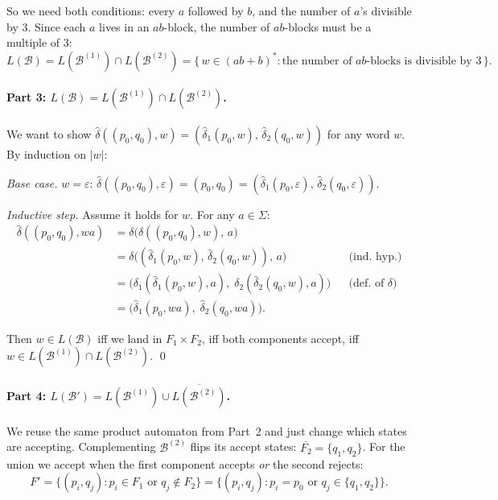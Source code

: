 \documentclass{article}
\theoremstyle{theorem}
\theoremstyle{definition}
\theoremstyle{remark}
\begin{document}
So we need both conditions: every $a$ followed by $b$, and the number of $a$'s divisible by 3. Since each $a$ lives in an $ab$-block, the number of $ab$-blocks must be a multiple of 3:
\[
  L(\mathcal{B}) = L(\mathcal{B}^{(1)}) \cap L(\mathcal{B}^{(2)})
  = \{\, w \in (ab+b)^* : \text{the number of } ab\text{-blocks is divisible by } 3 \,\}.
\]

\paragraph{Part 3: $L(\mathcal{B}) = L(\mathcal{B}^{(1)}) \cap L(\mathcal{B}^{(2)})$.}

We want to show $\hat\delta((p_0,q_0), w) = (\hat\delta_1(p_0, w),\, \hat\delta_2(q_0, w))$ for any word $w$. By induction on $|w|$:

\emph{Base case.} $w = \varepsilon$: $\hat\delta((p_0,q_0),\varepsilon) = (p_0,q_0) = (\hat\delta_1(p_0,\varepsilon),\, \hat\delta_2(q_0,\varepsilon))$. \checkmark

\emph{Inductive step.} Assume it holds for $w$. For any $a \in \Sigma$:
\begin{align*}
  \hat\delta((p_0,q_0), wa)
    &= \delta\bigl(\hat\delta((p_0,q_0), w),\, a\bigr) \\
    &= \delta\bigl((\hat\delta_1(p_0, w),\, \hat\delta_2(q_0, w)),\, a\bigr)
       && \text{(ind.\ hyp.)} \\
    &= \bigl(\delta_1(\hat\delta_1(p_0, w), a),\;
             \delta_2(\hat\delta_2(q_0, w), a)\bigr)
       && \text{(def.\ of } \delta \text{)} \\
    &= \bigl(\hat\delta_1(p_0, wa),\;
             \hat\delta_2(q_0, wa)\bigr).
\end{align*}

Then $w \in L(\mathcal{B})$ iff we land in $F_1 \times F_2$, iff both components accept, iff $w \in L(\mathcal{B}^{(1)}) \cap L(\mathcal{B}^{(2)})$. \qed

\paragraph{Part 4: $L(\mathcal{B}') = L(\mathcal{B}^{(1)}) \cup \overline{L(\mathcal{B}^{(2)})}$.}

We reuse the same product automaton from Part~2 and just change which states are accepting. Complementing $\mathcal{B}^{(2)}$ flips its accept states: $\overline{F_2} = \{q_1, q_2\}$. For the union we accept when the first component accepts \emph{or} the second rejects:
\[
  F' = \{(p_i, q_j) : p_i \in F_1 \text{ or } q_j \notin F_2\}
     = \{(p_i, q_j) : p_i = p_0 \text{ or } q_j \in \{q_1, q_2\}\}.
\]
\end{document}
